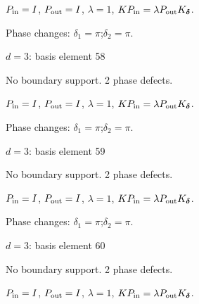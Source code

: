 \vspace{-1mm}
$P_{\rm in}=I$, \quad $P_{\rm out}=I$, \quad $\lambda=1$, \qquad $K P_{\rm in}=\lambda P_{\rm out}K_{\boldsymbol\delta}$.
\par\smallskip\begin{minipage}{.98\linewidth}\small Phase changes: $\delta_{1}=\pi$;\quad $\delta_{2}=\pi$.\end{minipage}
\vfill
{\footnotesize\texttt{}}
\newpage
{}
{\Large $d=3$: basis element 58}\par
No boundary support. 2 phase defects.
\begin{center}
\end{center}
\vspace{-1mm}
$P_{\rm in}=I$, \quad $P_{\rm out}=I$, \quad $\lambda=1$, \qquad $K P_{\rm in}=\lambda P_{\rm out}K_{\boldsymbol\delta}$.
\par\smallskip\begin{minipage}{.98\linewidth}\small Phase changes: $\delta_{1}=\pi$;\quad $\delta_{2}=\pi$.\end{minipage}
\vfill
{\footnotesize\texttt{}}
\newpage
{}
{\Large $d=3$: basis element 59}\par
No boundary support. 2 phase defects.
\begin{center}
\end{center}
\vspace{-1mm}
$P_{\rm in}=I$, \quad $P_{\rm out}=I$, \quad $\lambda=1$, \qquad $K P_{\rm in}=\lambda P_{\rm out}K_{\boldsymbol\delta}$.
\par\smallskip\begin{minipage}{.98\linewidth}\small Phase changes: $\delta_{1}=\pi$;\quad $\delta_{2}=\pi$.\end{minipage}
\vfill
{\footnotesize\texttt{}}
\newpage
{}
{\Large $d=3$: basis element 60}\par
No boundary support. 2 phase defects.
\begin{center}
\end{center}
\vspace{-1mm}
$P_{\rm in}=I$, \quad $P_{\rm out}=I$, \quad $\lambda=1$, \qquad $K P_{\rm in}=\lambda P_{\rm out}K_{\boldsymbol\delta}$.
